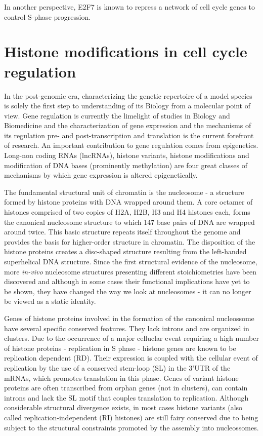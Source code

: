 \documentclass[11pt,twoside,a4paper]{report}
\begin{document}
			
			In another perspective, E2F7 is known to repress a network of cell cycle genes to control S-phase progression.\cite{Westendorp2012}
			\cite{Moon2008}
			\cite{Meserve2012}
			\cite{Chen2012}

	\clearpage
	\section{Histone modifications in cell cycle regulation}
	In the post-genomic era, characterizing the genetic repertoire of a model species is solely the first step to understanding of its Biology from a molecular point of view. Gene regulation is currently the limelight of studies in Biology and Biomedicine and the characterization of gene expression and the mechanisms of its regulation pre- and post-transcription and translation is the current forefront of research. An important contribution to gene regulation comes from epigenetics. Long-non coding RNAs (lncRNAs), histone variants, histone modifications and modification of DNA bases (prominently methylation) are four great classes of mechanisms by which gene expression is altered epigenetically. 
		
	The fundamental structural unit of chromatin is the nucleosome - a structure formed by histone proteins with DNA wrapped around them. A core octamer of histones comprised of two copies of H2A, H2B, H3 and H4 histones each, forms the canonical nucleosome structure to which 147 base pairs of DNA are wrapped around twice. This basic structure repeats itself throughout the genome and provides the basis for higher-order structure in chromatin. The disposition of the histone proteins creates a disc-shaped structure resulting from the left-handed superhelical DNA structure. Since the first structural evidence of the nucleosome, more \textit{in-vivo} nucleosome structures presenting different stoichiometries have been discovered and although in some cases their functional implications have yet to be shown, they have changed the way we look at nucleosomes - it can no longer be viewed as a static identity.

	Genes of histone proteins involved in the formation of the canonical nucleossome have several specific conserved features. They lack introns and are organized in clusters. Due to the occurrence of a major celluclar event requiring a high number of histone proteins - replication in S phase - histone genes are known to be replication dependent (RD). Their expression is coupled with the cellular event of replication by the use of a conserved stem-loop (SL) in the 3’UTR of the mRNAs, which promotes translation in this phase. Genes of variant histone proteins are often transcribed from orphan genes (not in clusters), can contain introns and lack the SL motif that couples translation to replication. Although considerable structural divergence exists, in most cases histone variants (also called replication-independent (RI) histones) are still fairy conserved due to being subject to the structural constraints promoted by the assembly into nucleossomes.
			
\end{document}
